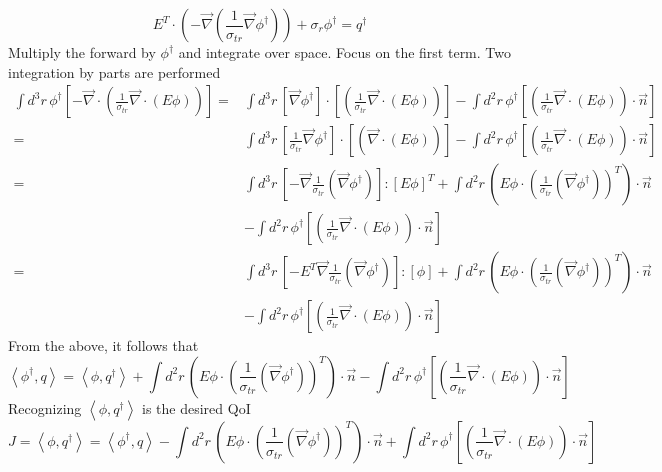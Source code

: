 \documentclass{article}
\newcommand{\bra}{\left\langle}
\newcommand{\ket}{\right\rangle}
\newcommand{\vdiv}{\vec{\nabla} \cdot}
\newcommand{\vgrad}{\vec{\nabla}}
\begin{document}
\[ E^T \cdot \left( - \vgrad \left( \frac{1}{\sigma_{tr}} \vgrad \phi^\dag \right) \right)
+ \sigma_r \phi^\dag
= q^\dag
\]
Multiply the forward by $\phi^\dag$ and integrate over space. Focus on the first term. Two integration by parts are performed
\begin{align*}
\int d^3r \, \phi^\dag \left[  -\vdiv \left( \frac{1}{\sigma_{tr}} \vdiv \left( E \phi \right) \right) \right] 
=& \int d^3r \, \left[ \vgrad \phi^\dag \right] \cdot \left[ \left( \frac{1}{\sigma_{tr}} \vdiv \left( E \phi \right) \right) \right] 
- \int d^2 r \, \phi^\dag \left[ \left( \frac{1}{\sigma_{tr}} \vdiv \left( E \phi \right) \right) \cdot \vec{n} \right] \\
=& \int d^3r \, \left[ \frac{1}{\sigma_{tr}} \vgrad \phi^\dag \right] \cdot \left[ \left(  \vdiv \left( E \phi \right) \right) \right] 
- \int d^2 r \, \phi^\dag \left[ \left( \frac{1}{\sigma_{tr}} \vdiv \left( E \phi \right) \right) \cdot \vec{n} \right] \\
=& \int d^3r \, \left[- \vgrad \frac{1}{ \sigma_{tr}} \left(  \vgrad \phi^\dag \right) \right] : \left[ E \phi \right]^T 
+ \int d^2 r \, \left( E \phi \cdot \left( \frac{1}{ \sigma_{tr}} \left(  \vgrad \phi^\dag \right) \right)^T \right) \cdot \vec{n} \\
&- \int d^2 r \, \phi^\dag \left[ \left( \frac{1}{\sigma_{tr}} \vdiv \left( E \phi \right) \right) \cdot \vec{n} \right]\\
=& \int d^3r \, \left[- E^T \vgrad \frac{1}{ \sigma_{tr}} \left(  \vgrad \phi^\dag \right) \right] : \left[ \phi \right] 
+ \int d^2 r \, \left( E \phi \cdot \left( \frac{1}{ \sigma_{tr}} \left(  \vgrad \phi^\dag \right) \right)^T \right) \cdot \vec{n} \\
&- \int d^2 r \, \phi^\dag \left[ \left( \frac{1}{\sigma_{tr}} \vdiv \left( E \phi \right) \right) \cdot \vec{n} \right]
\end{align*}
From the above, it follows that
\[
\bra \phi^\dag , q \ket = \bra \phi, q^\dag \ket + \int d^2 r \, \left( E \phi \cdot \left( \frac{1}{ \sigma_{tr}} \left(  \vgrad \phi^\dag \right) \right)^T \right) \cdot \vec{n} - \int d^2 r \, \phi^\dag \left[ \left( \frac{1}{\sigma_{tr}} \vdiv \left( E \phi \right) \right) \cdot \vec{n} \right]
\]
Recognizing $\bra \phi, q^\dag \ket $ is the desired QoI
\[
J = \bra \phi, q^\dag \ket = \bra \phi^\dag , q \ket - \int d^2 r \, \left( E \phi \cdot \left( \frac{1}{ \sigma_{tr}} \left(  \vgrad \phi^\dag \right) \right)^T \right) \cdot \vec{n} + \int d^2 r \, \phi^\dag \left[ \left( \frac{1}{\sigma_{tr}} \vdiv \left( E \phi \right) \right) \cdot \vec{n} \right]
\]
\end{document}
